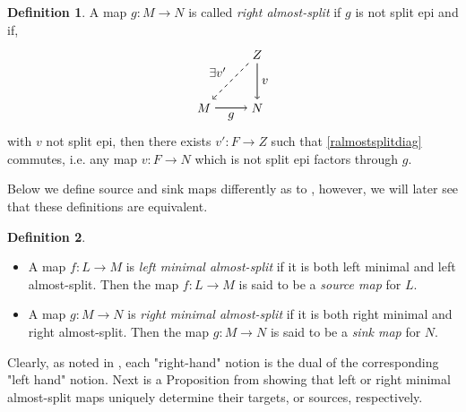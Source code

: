 \documentclass[11.5pt, twoside, a4paper, titlepage]{report}
\theoremstyle{definition}
\newtheorem{mydef}{Definition}[section]
\theoremstyle{plain}
\begin{document}
\begin{mydef}
A map $g: M \to N$ is called \emph{right almost-split} if $g$ is not split epi and if,
\begin{equation} \label{ralmostsplitdiag}
\begin{tikzpicture}[->,-latex, auto, main path/.style={->, semithick}, main node/.style={}]
\node	[main node]		(1) at (0,0)		{$M$};
\node [main node]		(2) at (1.5,0)	{$N$};
\node [main node]		(3) at (1.5,1.5)	{$Z$};

\draw (1) [main path] edge node [auto, swap] {$g$} (2);
\draw (3) [main path] edge node [auto] {$v$} (2);
\draw (3) [->, dashed, semithick] edge node [auto, swap] {$\exists v'$} (1);
\end{tikzpicture}
\end{equation}
with $v$ not split epi, then there exists $v': F \to Z$ such that \ref{ralmostsplitdiag} commutes, i.e. any map $v: F \to N$ which is not split epi factors through $g$.
\end{mydef}

Below we define source and sink maps differently as to \cite{CB3}, however, we will later see that these definitions are equivalent.

\begin{mydef}
\begin{itemize}
\item A map $f: L \to M$ is \emph{left minimal almost-split} if it is both left minimal and left almost-split. Then the map $f: L \to M$ is said to be a  \emph{source map} for $L$.
\item A map $g: M \to N$ is \emph{right minimal almost-split} if it is both right minimal and right almost-split.  Then the map $g: M \to N$ is said to be a  \emph{sink map} for $N$.
\end{itemize}
\end{mydef}

Clearly, as noted in \cite{Assem}, each "right-hand" notion is the dual of the corresponding "left hand" notion. Next is a Proposition from \cite{Assem} showing that left or right minimal almost-split maps uniquely determine their targets, or sources, respectively. 
\end{document}
